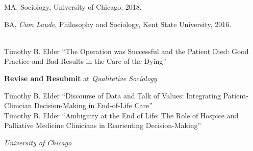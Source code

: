 \documentclass[11pt,article,oneside]{memoir}
\begin{document}
\ind MA, Sociology, University of Chicago, 2018.

\ind BA, \emph{Cum Laude}, Philosophy and Sociology, Kent State University, 2016. \vspace{0.1in}

\bigskip


\ind {} \\

\ind Timothy B. Elder ``The Operation was Successful and the Patient Died: Good Practice and Bad Results in the Care of the Dying'' \\
	\strut\hspace{0.4in} \footnotesize \textbf{Revise and Resubmit} at \textit{Qualitative Sociology} \normalsize \\

\bigskip


\ind Timothy B. Elder ``Discourse of Data and Talk of Values: Integrating Patient-Clinician Decision-Making in End-of-Life Care'' \\

\ind Timothy B. Elder ``Ambiguity at the End of Life: The Role of Hospice and Palliative Medicine Clinicians in Reorienting Decision-Making'' \\

\medskip



\noindent\emph{University of Chicago \vspace{0.01in}}
\end{document}
